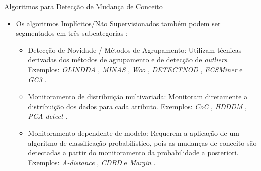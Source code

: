 \documentclass[10pt]{beamer}
\begin{document}
\begin{frame}{Algoritmos para Detecção de Mudança de Conceito}
    \begin{itemize}
        \item<1 -> Os algoritmos \alert{Implícitos/Não Supervisionados} também podem ser segmentados em três subcategorias \cite{GONCALVES20148144}:
        \begin{itemize}
        \item<2 -> \alert{Detecção de Novidade / Métodos de Agrupamento}: Utilizam técnicas derivadas dos métodos de agrupamento e de detecção de \textit{outliers}. Exemplos: \textit{OLINDDA} \cite{Spinosa:2007:OCA:1244002.1244107}, \textit{MINAS} \cite{Faria:2013:NDA:2480362.2480515}, \textit{Woo} \cite{Ryu:Kantardzic:2012}, \textit{DETECTNOD} \cite{Hashemi:Hayat:DETECTNOD:2010}, \textit{ECSMiner} \cite{Masud:2011:CNC:1978259.1978529} e \textit{GC3} \cite{Sethi2016b:GC3}.
        \item<3 -> \alert{Monitoramento de distribuição multivariada}: Monitoram diretamente a distribuição dos dados para cada atributo. Exemplos: \textit{CoC} \cite{Lee:Magoules:CoC:2012}, \textit{HDDDM} \cite{Ditzler:Polikar:HDDDM:2011}, \textit{PCA-detect} \cite{Kuncheva:PCADetect:20085}.
        \item<4 -> \alert{Monitoramento dependente de modelo}: Requerem a aplicação de um algoritmo de classificação probabilístico, pois as mudanças de conceito são detectadas a partir do monitoramento da probabilidade a posteriori. Exemplos: \textit{A-distance} \cite{Dredze:ADistance:2010585}, \textit{CDBD} \cite{Lindstrom:CDBD:2013} e \textit{Margin} \cite{Dries:Margin:2009}.
        \end{itemize}
    \end{itemize}
\end{frame}
\end{document}

